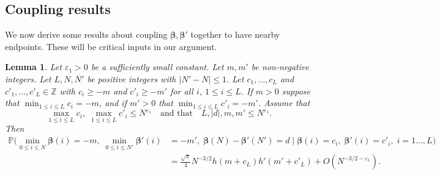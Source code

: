 \documentclass[11pt,reqno]{amsart}
\numberwithin{equation}{section}
\newtheorem{lemma}[theorem]{Lemma}
\theoremstyle{definition}
\theoremstyle{remark}
\newcommand{\mb}{\mathbb}
\newcommand{\eps}{\varepsilon}
\def\boldbeta{\boldsymbol\beta}
\renewcommand{\le}{\leqslant}
\renewcommand{\ge}{\geqslant}
\newcommand\Z{\mathbb{Z}}
\begin{document}
\subsection{Coupling results}

We now derive some results about coupling $\boldbeta,\boldbeta'$ together to have nearby endpoints. These will be critical inputs in our argument.

\begin{lemma}\label{decoupling} Let $\eps_1 > 0$ be a sufficiently small constant. Let $m,m'$ be non-negative integers. Let $L, N, N'$ be positive integers with $|N' - N| \le 1$. Let $c_1,\dots, c_L$ and $c'_1,\dots, c'_L \in \Z$ with $c_i \ge -m$ and $c'_i \ge -m'$ for all $i$, $1 \le i \le L$. If $m > 0$ suppose that $\min_{1 \le i \le L} c_i = -m$, and if $m' > 0$ that $\min_{1 \le i \le L} c'_i = -m'$. Assume that \[ \max_{1 \le i \le L} c_i, \; \max_{1 \le i \le L} c'_i \le N^{\eps_1} \quad \mbox{and that} \quad L,|d|,m,m' \le N^{\eps_1}.\] Then
\begin{align*} \mb{P} \big(\min_{0 \le i \le N} \boldbeta(i) = -m,\;  \min_{0 \le i \le N'} \boldbeta'(i) & = -m',\;  \boldbeta(N) - \boldbeta'(N') = d \mid  \boldbeta(i) = c_i, \; \boldbeta'(i) = c'_i, \; i = 1\dots,L\big) \\ & =  \frac{\sqrt{\pi}}{4} N^{-3/2} h(m + c_L) h'(m' + c'_L) + O(N^{-3/2 - \eps_1}). \end{align*}   
\end{lemma}
\end{document}
